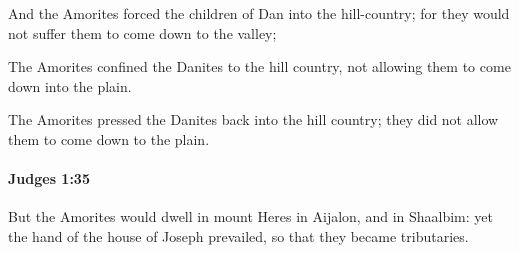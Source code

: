 			\begin{versebox}
					\item[BHS] 
					\item[ASV] And the Amorites forced the children of Dan into the hill-country; for they would not suffer them to come down to the valley;
					\item[NIV] The Amorites confined the Danites to the hill country, not allowing them to come down into the plain.
					\item[NRSV] The Amorites pressed the Danites back into the hill country; they did not allow them to come down to the plain.
			\end{versebox}

		\paragraph{Judges 1:35} %
			\label{JUDGES-1-35}

			But the Amorites would dwell in mount Heres in Aijalon, and in Shaalbim: yet the hand of the house of Joseph prevailed, so that they became tributaries.

